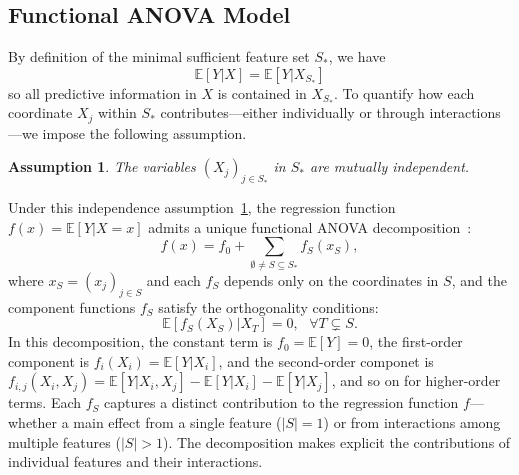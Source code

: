 \documentclass[sn-mathphys-num]{sn-jnl}%
\numberwithin{equation}{section}
\newcommand{\E}{\mathbb{E}}
\newtheorem{assumption}{Assumption}[section]
\theoremstyle{thmstyleone}%
\theoremstyle{thmstyletwo}%
\theoremstyle{thmstylethree}%
\begin{document}




\subsection{Functional ANOVA Model} 
\label{sec:functional-anova-model}
By definition of the minimal sufficient feature set $S_*$, we have
\begin{equation*}
	\E[Y|X] = \E[Y|X_{S_*}]
\end{equation*}
so all predictive information in $X$ is contained in $X_{S_*}$.  
To quantify how each coordinate $X_j$ within $S_*$ contributes---either individually 
or through interactions---we impose the following assumption.

\vspace{.5em}


\begin{assumption}
\label{assumption:feature-variable}
The variables $(X_j)_{j \in S_*}$ in $S_*$ are mutually independent.
\end{assumption} 


Under this independence assumption~\ref{assumption:feature-variable}, the regression function $f(x) = \E[Y|X=x]$ admits a unique functional ANOVA decomposition~\cite{Stone94}: 
\[
    f(x) = f_0 + \sum_{\emptyset \neq S \subseteq S_*} f_S(x_S),
\]
where $x_S = (x_j)_{j \in S}$ and each $f_S$ depends only on the coordinates in $S$, 
and the component functions $f_S$ satisfy the orthogonality 
conditions: %
\[
    \mathbb{E}[f_S(X_S)|X_T] = 0, ~~~\forall T \subsetneq S.
\]
In this decomposition, the constant term is $f_0 = \E[Y] = 0$, the first-order component is $f_i(X_i) = \E[Y|X_i]$, 
and the second-order componet is $f_{i, j}(X_i, X_j) = \E[Y|X_i, X_j] - \E[Y|X_i] -\E[Y|X_j]$, and so on for higher-order terms.
Each $f_S$ captures a distinct contribution to the regression function $f$---whether a main effect
from a single feature ($|S| = 1$) or from interactions among multiple features ($|S| > 1$). The decomposition makes explicit the contributions of individual features and their interactions. %
\end{document}
